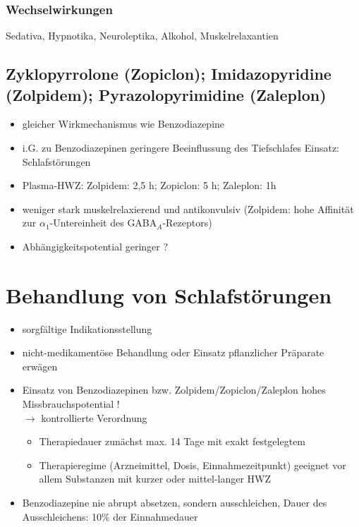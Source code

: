 \documentclass[10pt,a4paper]{report}
\begin{document}
\subsubsection{Wechselwirkungen} %
\label{ssub:wechselwirkungen}
Sedativa, Hypnotika, Neuroleptika, Alkohol, Muskelrelaxantien
\subsection{Zyklopyrrolone (Zopiclon);  Imidazopyridine (Zolpidem); Pyrazolopyrimidine (Zaleplon)} %
\label{sub:zyklopyrrolone_zopiclon_imidazopyridine_zolpidem_pyrazolopyrimidine_zaleplon_}
\begin{itemize}
	\item gleicher Wirkmechanismus wie Benzodiazepine
	\item i.G. zu Benzodiazepinen geringere Beeinflussung des Tiefschlafes
	Einsatz: Schlafstörungen
	\item Plasma-HWZ:  Zolpidem: 2,5 h; Zopiclon: 5 h;  Zaleplon: 1h
	\item weniger stark muskelrelaxierend und antikonvulsiv
	(Zolpidem: hohe Affinität zur $\alpha_1$-Untereinheit des GABA$_A$-Rezeptors)
	\item Abhängigkeitspotential geringer ?
\end{itemize}
\section{Behandlung von Schlafstörungen} %
\label{sec:behandlung_von_schlafst_rungen}
\begin{itemize}
	\item  sorgfältige Indikationsstellung
	\item nicht-medikamentöse Behandlung oder Einsatz pflanzlicher Präparate erwägen
	\item Einsatz von Benzodiazepinen bzw. Zolpidem/Zopiclon/Zaleplon hohes Missbrauchspotential !\\
  	$\rightarrow$ kontrollierte Verordnung
  	\begin{itemize}
  		\item Therapiedauer zunächst max. 14 Tage mit exakt festgelegtem    
		\item Therapieregime (Arzneimittel, Dosis, Einnahmezeitpunkt) geeignet vor allem Substanzen mit kurzer oder mittel-langer HWZ
  	\end{itemize}
  	\item Benzodiazepine nie abrupt absetzen, sondern ausschleichen, Dauer des Ausschleichens: 10\% der Einnahmedauer
\end{itemize}
\end{document}

